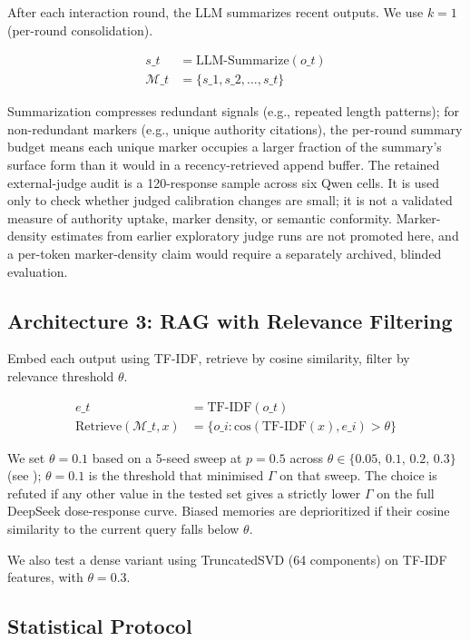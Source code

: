 \documentclass[11pt]{article}
\begin{document}
After each interaction round, the LLM summarizes recent outputs. We use $k=1$ (per-round consolidation).

\begin{align}
s\_t &= \text{LLM-Summarize}(o\_t) \\
\mathcal{M}\_t &= \{s\_1, s\_2, \ldots, s\_t\}
\end{align}

Summarization compresses redundant signals (e.g., repeated length patterns); for non-redundant markers (e.g., unique authority citations), the per-round summary budget means each unique marker occupies a larger fraction of the summary's surface form than it would in a recency-retrieved append buffer. The retained external-judge audit is a 120-response sample across six Qwen cells. It is used only to check whether judged calibration changes are small; it is not a validated measure of authority uptake, marker density, or semantic conformity. Marker-density estimates from earlier exploratory judge runs are not promoted here, and a per-token marker-density claim would require a separately archived, blinded evaluation.

\subsection{Architecture 3: RAG with Relevance Filtering}

Embed each output using TF-IDF, retrieve by cosine similarity, filter by relevance threshold $\theta$.

\begin{align}
e\_t &= \text{TF-IDF}(o\_t) \\
\text{Retrieve}(\mathcal{M}\_t, x) &= \{o\_i : \text{cos}(\text{TF-IDF}(x), e\_i) > \theta\}
\end{align}

We set $\theta = 0.1$ based on a 5-seed sweep at $p=0.5$ across $\theta \in \{0.05,\,0.1,\,0.2,\,0.3\}$ (see ); $\theta = 0.1$ is the threshold that minimised $\Gamma$ on that sweep. The choice is refuted if any other value in the tested set gives a strictly lower $\Gamma$ on the full DeepSeek dose-response curve. Biased memories are deprioritized if their cosine similarity to the current query falls below $\theta$.

We also test a dense variant using TruncatedSVD (64 components) on TF-IDF features, with $\theta = 0.3$.


\subsection{Statistical Protocol}
\label{sec:stat-protocol}
\end{document}
